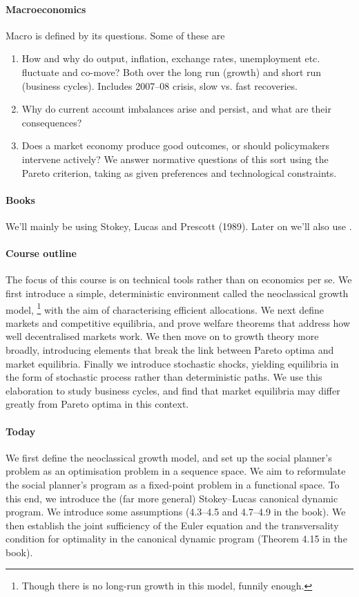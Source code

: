 \documentclass[11pt,letterpaper,reqno,oneside]{article}
\begin{document}
\paragraph{Macroeconomics}
Macro is defined by its questions. Some of these are
%
\begin{enumerate}
	\item How and why do output, inflation, exchange rates, unemployment etc. fluctuate and co-move? Both over the long run (growth) and short run (business cycles). Includes 2007--08 crisis, slow vs. fast recoveries.
	\item Why do current account imbalances arise and persist, and what are their consequences?
	\item Does a market economy produce good outcomes, or should policymakers intervene actively? We answer normative questions of this sort using the Pareto criterion, taking as given preferences and technological constraints.
\end{enumerate}

\paragraph{Books}
We'll mainly be using Stokey, Lucas and Prescott (1989)\nocite{StokeyLucasPrescott1989}. Later on we'll also use \textcite{LjungqvistSargent2012}.

\paragraph{Course outline}
The focus of this course is on technical tools rather than on economics per se. We first introduce a simple, deterministic environment called the neoclassical growth model,%
	\footnote{Though there is no long-run growth in this model, funnily enough.}
with the aim of characterising efficient allocations. We next define markets and competitive equilibria, and prove welfare theorems that address how well decentralised markets work. We then move on to growth theory more broadly, introducing elements that break the link between Pareto optima and market equilibria. Finally we introduce stochastic shocks, yielding equilibria in the form of stochastic process rather than deterministic paths. We use this elaboration to study business cycles, and find that market equilibria may differ greatly from Pareto optima in this context.

\paragraph{Today}
We first define the neoclassical growth model, and set up the social planner's problem as an optimisation problem in a sequence space. We aim to reformulate the social planner's program as a fixed-point problem in a functional space. To this end, we introduce the (far more general) Stokey--Lucas canonical dynamic program. We introduce some assumptions (4.3--4.5 and 4.7--4.9 in the book). We then establish the joint sufficiency of the Euler equation and the transversality condition for optimality in the canonical dynamic program (Theorem 4.15 in the book).
\end{document}
